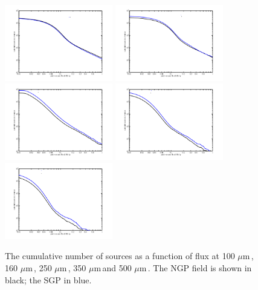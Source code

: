 \documentclass[useAMS,usenatbib]{mn2e}
\def\mic{ $\mu $m\,}
\begin{document}
\begin{figure} %
\includegraphics[width=0.42\textwidth,clip,trim={0 9mm 0mm 16mm}]{cum_counts_100.pdf}
\includegraphics[width=0.42\textwidth,clip,trim={0 9mm 0mm 16mm}]{cum_counts_160.pdf}
\includegraphics[width=0.42\textwidth,clip,trim={0 9mm 0mm 16mm}]{cum_counts_250.pdf}
\includegraphics[width=0.42\textwidth,clip,trim={0 9mm 0mm 16mm}]{cum_counts_350.pdf}
\includegraphics[width=0.42\textwidth,clip,trim={0 9mm 0mm 16mm}]{cum_counts_500.pdf}
\caption{\protect\label{fig_cum_flux} The cumulative number of sources as a
  function of flux at 100\mic, 160\mic, 250\mic, 350\mic and 500\mic. The NGP field is
shown in black; the SGP in blue. 
}
\end{figure}
\end{document}
